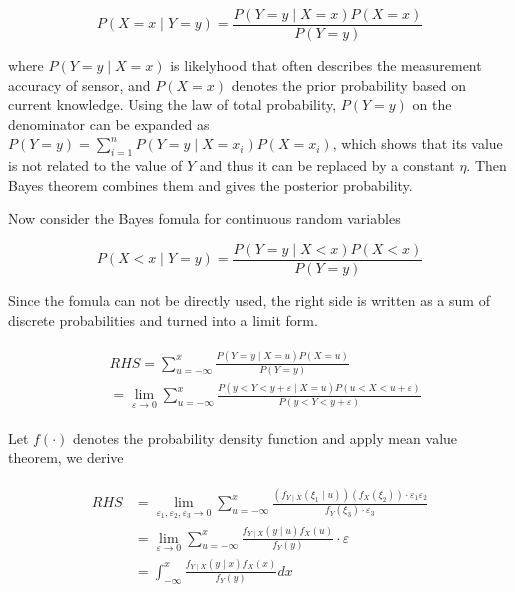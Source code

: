 \documentclass[conference]{IEEEtran}
\begin{document}
	\begin{equation}
		P(X=x\mid Y=y)=\frac{P(Y=y\mid X=x)P(X=x)}{P(Y=y)}
		\label{eq1}
	\end{equation}
	
	where $P(Y=y\mid X=x)$ is likelyhood that often describes the measurement accuracy of sensor, and $P(X=x)$ denotes the prior probability based on current knowledge. Using the law of total probability, $P(Y=y)$ on the denominator can be expanded as $P(Y=y)=\sum_{i=1}^{n}P(Y=y \mid X=x_{i})P(X=x_{i})$, which shows that its value is not related to the value of $Y$ and thus it can be replaced by a constant $\eta $. Then Bayes theorem combines them and gives the posterior probability.
	
	Now consider the Bayes fomula for continuous random variables
	
	\begin{equation}
	P(X<x\mid Y=y)=\frac{P(Y=y\mid X<x)P(X<x)}{P(Y=y)}
	\label{eq2}
	\end{equation}
	
	Since the fomula can not be directly used, the right side is written as a sum of discrete probabilities and turned into a limit form. 
	
	\begin{equation}
	\begin{split}
	\begin{aligned}
	&RHS=\sum_{u=-\infty}^{x}\frac{P(Y=y\mid X=u)P(X=u)}{P(Y=y)}
	\\
	&=\lim_{\varepsilon \rightarrow 0}\sum_{u=-\infty}^{x}\frac{P(y<Y<y+\varepsilon \mid X=u)P(u<X<u+\varepsilon )}{P(y<Y<y+\varepsilon )}
	\nonumber
	\end{aligned}
	\end{split}
	\end{equation}
	
	Let $f(\cdot )$ denotes the probability density function and apply mean value theorem, we derive
	
	\begin{equation}
	\begin{split}
	\begin{aligned}
	RHS&=\lim_{\varepsilon_{1}, \varepsilon_{2}, \varepsilon_{3} \rightarrow 0}\sum_{u=-\infty}^{x} \frac{(f_{Y\mid X}(\xi _{1}\mid u)) (f_{X}(\xi _{2}))\cdot \varepsilon_{1} \varepsilon_{2}}{f_{Y}
		(\xi _{3})\cdot \varepsilon_{3}}\\
	&=\lim_{\varepsilon \rightarrow 0}\sum_{u=-\infty}^{x}\frac{f_{Y\mid X}(y\mid u)f_{X}(u)}{f_{Y}(y)}\cdot \varepsilon\\ 
	&=\int_{-\infty}^{x}\frac{f_{Y\mid X}(y\mid x)f_{X}(x)}{f_{Y}(y)}dx
	\nonumber
	\end{aligned}
	\end{split}
	\end{equation}
	
\end{document}
